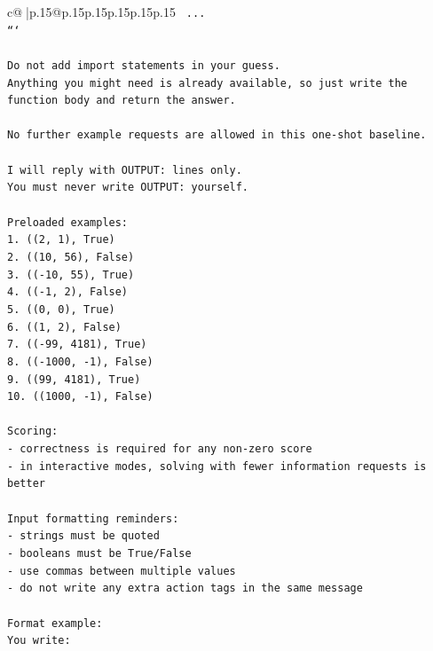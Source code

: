 \documentclass{article}
\begin{document}
{\begin{supertabular}{c@{$\;$}|p{.15\linewidth}@{}p{.15\linewidth}p{.15\linewidth}p{.15\linewidth}p{.15\linewidth}p{.15\linewidth}}
{{{\texttt{    ...} \\
\texttt{```} \\
\\ 
\texttt{Do not add import statements in your guess.} \\
\texttt{Anything you might need is already available, so just write the function body and return the answer.} \\
\\ 
\texttt{No further example requests are allowed in this one{-}shot baseline.} \\
\\ 
\texttt{I will reply with OUTPUT: lines only.} \\
\texttt{You must never write OUTPUT: yourself.} \\
\\ 
\texttt{Preloaded examples:} \\
\texttt{1. ((2, 1), True)} \\
\texttt{2. ((10, 56), False)} \\
\texttt{3. (({-}10, 55), True)} \\
\texttt{4. (({-}1, 2), False)} \\
\texttt{5. ((0, 0), True)} \\
\texttt{6. ((1, 2), False)} \\
\texttt{7. (({-}99, 4181), True)} \\
\texttt{8. (({-}1000, {-}1), False)} \\
\texttt{9. ((99, 4181), True)} \\
\texttt{10. ((1000, {-}1), False)} \\
\\ 
\texttt{Scoring:} \\
\texttt{{-} correctness is required for any non{-}zero score} \\
\texttt{{-} in interactive modes, solving with fewer information requests is better} \\
\\ 
\texttt{Input formatting reminders:} \\
\texttt{{-} strings must be quoted} \\
\texttt{{-} booleans must be True/False} \\
\texttt{{-} use commas between multiple values} \\
\texttt{{-} do not write any extra action tags in the same message} \\
\\ 
\texttt{Format example:} \\
\texttt{You write:} \\
}}}
\end{supertabular}}
\end{document}
